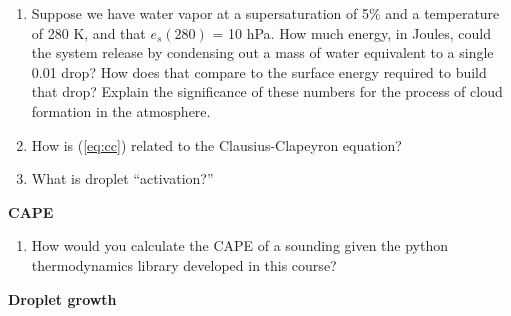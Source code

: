 \documentclass[12pt]{article}
\begin{document}
\begin{enumerate}
\item Suppose we have water vapor at a supersaturation of 5\% and a
  temperature of 280 K, and that $e_s(280)$ = 10 hPa.  
How much energy, in Joules, could the system
  release by condensing out a mass of water equivalent to a single
  0.01 \mum drop?  How does that compare to the surface energy
  required to build that drop?  Explain the significance of these
  numbers for the process of cloud formation in the atmosphere.


\item How is  (\ref{eq:cc}) related to the Clausius-Clapeyron equation?


\item What is droplet ``activation?''



\end{enumerate}



\textbf{CAPE}

\begin{enumerate}
\item[CA1]  How would you calculate the CAPE of a sounding given the
python thermodynamics library developed in this course?
\end{enumerate}

\textbf{Droplet growth}
\end{document}
